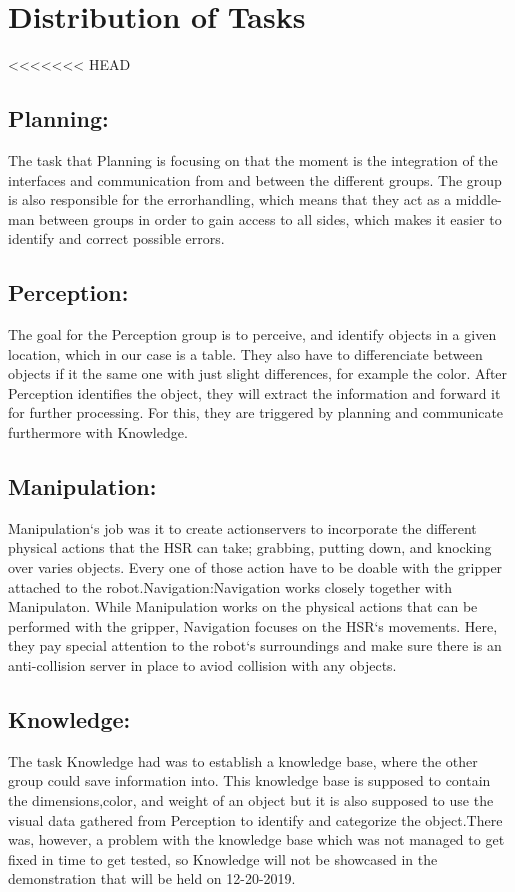 \documentclass[main.tex]{subfiles}
\begin{document}
	
	\chapter{Distribution of Tasks}
<<<<<<< HEAD
		\section{Planning:}
		The task that Planning is focusing on that the moment is the integration of the interfaces and communication from and between the different groups. The group is also responsible for the errorhandling, which means that they act as a middle-man between groups in order to gain access to all sides, which makes it easier to identify and correct possible errors.
		
		\section{Perception:}
		The goal for the Perception group is to perceive, and identify objects in a given location, which in our case is a table. They also have to differenciate between objects if it the same one with just slight differences, for example the color. After Perception identifies the object, they  will extract the information and forward it for further processing. For this, they are triggered by planning and communicate furthermore with Knowledge.
		
		\section{Manipulation:}
		Manipulation‘s job was it to create actionservers to incorporate the different physical actions that the HSR can take; grabbing, putting down, and knocking over varies objects. Every one of those action have to be doable with the gripper attached to the robot.Navigation:Navigation works closely together with Manipulaton. While Manipulation works on the physical actions that can be performed with the gripper, Navigation focuses on the HSR‘s movements. Here, they pay special attention to the robot‘s surroundings and make sure there is an anti-collision server in place to aviod collision with any objects.
		
		\section{Knowledge:}
		The task Knowledge had was to establish a knowledge base, where the other group could save information into. This knowledge base is supposed to contain the dimensions,color, and weight of an object but it is also supposed to use the visual data gathered from Perception to identify and categorize the object.There was, however, a problem with the knowledge base which was not managed to get fixed in time to get tested, so Knowledge will not be showcased in the demonstration that will be held on 12-20-2019.
		
\end{document}
